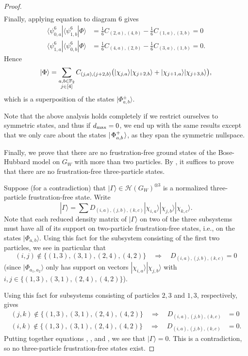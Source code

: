 \documentclass[../thesis-main/thesis-main]{subfiles}
\begin{document}
\begin{proof}
\begin{align}
\end{align}
Finally, applying equation  to diagram $6$ gives
\begin{align}
\langle\psi_{0,a}^{6}|\langle\psi_{1,b}^{6}|\Phi\rangle&=\frac{1}{6}C_{(2,a),(4,b)}-\frac{1}{6}C_{(1,a),(3,b)}=0\\
\langle\psi_{1,a}^{6}|\langle\psi_{0,b}^{6}|\Phi\rangle&=\frac{1}{6}C_{(4,a),(2,b)}-\frac{1}{6}C_{(3,a),(1,b)}=0.
\end{align}
Hence
\begin{equation}
|\Phi\rangle=\sum_{\substack{a,b\in\mathbb{F}_2\\j\in[4]}}C_{(j,a),(j+2,b)}\big(|\chi_{j,a}\rangle|\chi_{j+2,b}\rangle+|\chi_{j+1,a}\rangle|\chi_{j+3,b}\rangle\big),
\end{equation}
which is a superposition of the states $|\Phi_{a,b}^\pm\rangle.$ 

Note that the above analysis holds completely if we restrict ourselves to symmetric states, and thus if $d_{\text{max}} = 0$, we end up with the same results except that we only care about the states $|\mspace{2mu} \Phi_{a,b}^+ \mspace{2mu} \rangle$, as they span the symmetric nullspace.

Finally, we prove that there are no frustration-free ground states of the Bose-Hubbard model on $G_{W}$ with more than two particles. By ,
it suffices to prove that there are no frustration-free three-particle states.

Suppose (for a contradiction) that $|\Gamma\rangle\in\mathcal{H}(G_{W})^{\otimes 3}$ is a normalized three-particle frustration-free state. Write 
\begin{equation}
|\Gamma\rangle=\sum D_{(i,a),(j,b),(k,c)}|\chi_{i,a}\rangle|\chi_{j,b}\rangle|\chi_{k,c}\rangle.
\end{equation}
Note that each reduced density matrix of $|\Gamma\rangle$ on two of the three subsystems must have all of its support on two-particle frustration-free states, i.e., on the states $|\Phi_{a,b}\rangle$. Using this fact for the subsystem consisting of the first two particles, we see in particular that
\begin{equation}
(i,j)\notin\{(1,3),(3,1),(2,4),(4,2)\}\quad\Longrightarrow\quad D_{(i,a),(j,b),(k,c)}=0\label{eq:ij_constraint1}
\end{equation}
(since $|\Phi_{a_1,a_2}\rangle$ only has support on vectors $|\chi_{i,a}\rangle|\chi_{j,b}\rangle$ with $i,j\in \{(1,3),(3,1),(2,4),(4,2)\}$).

Using this fact for subsystems consisting of particles $2,3$ and $1,3$, respectively, gives 
\begin{align}
(j,k)\notin\{(1,3),(3,1),(2,4),(4,2)\}\quad\Longrightarrow\quad D_{(i,a),(j,b),(k,c)} & =0\label{eq:ij_constraint2}\\
(i,k)\notin\{(1,3),(3,1),(2,4),(4,2)\}\quad\Longrightarrow\quad D_{(i,a),(j,b),(k,c)} & =0.\label{eq:ij_constraint3}
\end{align}
Putting together equations , , and , we see that $|\Gamma\rangle=0$. This is a contradiction, so no three-particle frustration-free states exist.
\end{proof}
\end{document}
